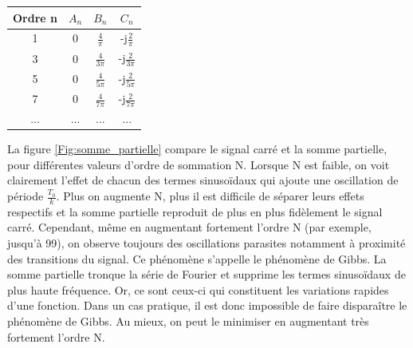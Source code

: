 	\begin{table}[h!]
		\centering
		\begin{tabular}{|c|c|c|c|}
			\hline
			\textbf{Ordre n} & \textbf{$A_{n}$} & \textbf{$B_{n}$} & \textbf{$C_{n}$}\\
			\hline
			1 & 0 & $\frac{4}{\pi}$ & -j$\frac{2}{\pi}$ \\	
			\hline
			3 & 0 & $\frac{4}{3\pi}$ & -j$\frac{2}{3\pi}$ \\	
			\hline
			5 & 0 & $\frac{4}{5\pi}$ & -j$\frac{2}{5\pi}$ \\	
			\hline
			7 & 0 & $\frac{4}{7\pi}$ & -j$\frac{2}{7\pi}$ \\	
			\hline
			... & ... & ... & ... \\
			\hline
		\end{tabular}	
	\end{table}
	
	La figure \ref{Fig:somme_partielle} compare le signal carré et la somme partielle, pour différentes valeurs d'ordre de sommation N. Lorsque N est faible, on voit clairement l'effet de chacun des termes sinusoïdaux qui ajoute une oscillation de période $\frac{T_{0}}{k}$. Plus on augmente N, plus il est difficile de séparer leurs effets respectifs et la somme partielle reproduit de plus en plus fidèlement le signal carré. Cependant, même en augmentant fortement l'ordre N (par exemple, jusqu'à 99), on observe toujours des oscillations parasites notamment à proximité des transitions du signal. Ce phénomène s'appelle le phénomène de Gibbs. La somme partielle tronque la série de Fourier et supprime les termes sinusoïdaux de plus haute fréquence. Or, ce sont ceux-ci qui constituent les variations rapides d'une fonction. Dans un cas pratique, il est donc impossible de faire disparaître le phénomène de Gibbs. Au mieux, on peut le minimiser en augmentant très fortement l'ordre N. 
	
